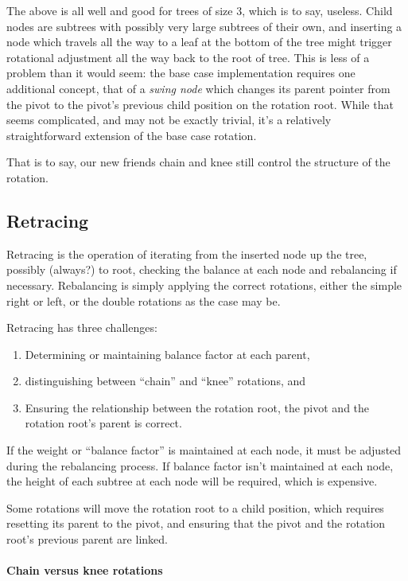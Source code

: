 \documentclass{article}
\begin{document}
The above is all well and good for trees of size 3, which is to say, useless.
Child nodes are subtrees with possibly very large subtrees of their own,
and inserting a node which travels all the way to a leaf at the bottom
of the tree might trigger rotational adjustment all the way back to the
root of tree. This is less of a problem than it would seem: the base
case implementation requires one additional concept, that of a
\textit{swing node} which changes its parent pointer from the pivot to
the pivot's previous child position on the rotation root. While that
seems complicated, and may not be exactly trivial, it's a relatively
straightforward extension of the base case rotation.

That is to say, our new friends chain and knee still control the structure
of the rotation.


\subsection{Retracing}

Retracing is the operation of iterating from the inserted
node up the tree, possibly (always?) to root, checking
the balance at each node and rebalancing if necessary.
Rebalancing is simply applying the correct rotations,
either the simple right or left, or the double rotations
as the case may be.

Retracing has three challenges:

\begin{enumerate}
  \item Determining or maintaining balance factor at each parent,
  \item distinguishing between ``chain'' and ``knee'' rotations, and
  \item Ensuring the relationship between the rotation root, the pivot
    and the rotation root's parent is correct.
\end{enumerate}

If the weight or ``balance factor'' is maintained at each node, it must be
adjusted during the rebalancing process. If balance factor isn't maintained at
each node, the height of each subtree at each node will be required, which is
expensive.

Some rotations will move the rotation root to a child position, which
requires resetting its parent to the pivot, and ensuring that the
pivot and the rotation root's previous parent are linked.

\paragraph{Chain versus knee rotations}
\end{document}
